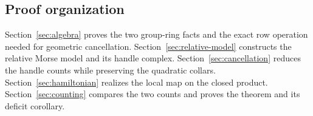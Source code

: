 \subsection{Proof organization}
Section~\ref{sec:algebra} proves the two group-ring facts and the exact
row operation needed for geometric cancellation.
Section~\ref{sec:relative-model} constructs the relative Morse model and
its handle complex. Section~\ref{sec:cancellation} reduces the handle
counts while preserving the quadratic collars.
Section~\ref{sec:hamiltonian} realizes the local map on the closed product.
Section~\ref{sec:counting} compares the two counts and proves the theorem
and its deficit corollary.
